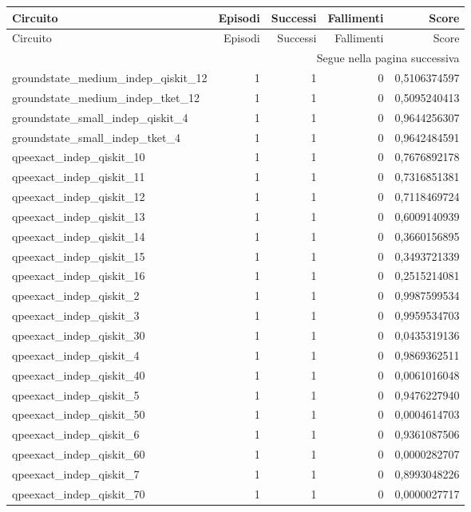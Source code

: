 \begin{longtable}{lrrrr}
\toprule
Circuito & Episodi & Successi & Fallimenti & Score \\
\midrule
\endfirsthead
\toprule
Circuito & Episodi & Successi & Fallimenti & Score \\
\midrule\endhead
\midrule\multicolumn{5}{r}{\footnotesize Segue nella pagina successiva}\\
\endfoot
\bottomrule\endlastfoot
groundstate\_medium\_indep\_qiskit\_12 & 1 & 1 & 0 & 0,5106374597 \\
groundstate\_medium\_indep\_tket\_12 & 1 & 1 & 0 & 0,5095240413 \\
groundstate\_small\_indep\_qiskit\_4 & 1 & 1 & 0 & 0,9644256307 \\
groundstate\_small\_indep\_tket\_4 & 1 & 1 & 0 & 0,9642484591 \\
qpeexact\_indep\_qiskit\_10 & 1 & 1 & 0 & 0,7676892178 \\
qpeexact\_indep\_qiskit\_11 & 1 & 1 & 0 & 0,7316851381 \\
qpeexact\_indep\_qiskit\_12 & 1 & 1 & 0 & 0,7118469724 \\
qpeexact\_indep\_qiskit\_13 & 1 & 1 & 0 & 0,6009140939 \\
qpeexact\_indep\_qiskit\_14 & 1 & 1 & 0 & 0,3660156895 \\
qpeexact\_indep\_qiskit\_15 & 1 & 1 & 0 & 0,3493721339 \\
qpeexact\_indep\_qiskit\_16 & 1 & 1 & 0 & 0,2515214081 \\
qpeexact\_indep\_qiskit\_2 & 1 & 1 & 0 & 0,9987599534 \\
qpeexact\_indep\_qiskit\_3 & 1 & 1 & 0 & 0,9959534703 \\
qpeexact\_indep\_qiskit\_30 & 1 & 1 & 0 & 0,0435319136 \\
qpeexact\_indep\_qiskit\_4 & 1 & 1 & 0 & 0,9869362511 \\
qpeexact\_indep\_qiskit\_40 & 1 & 1 & 0 & 0,0061016048 \\
qpeexact\_indep\_qiskit\_5 & 1 & 1 & 0 & 0,9476227940 \\
qpeexact\_indep\_qiskit\_50 & 1 & 1 & 0 & 0,0004614703 \\
qpeexact\_indep\_qiskit\_6 & 1 & 1 & 0 & 0,9361087506 \\
qpeexact\_indep\_qiskit\_60 & 1 & 1 & 0 & 0,0000282707 \\
qpeexact\_indep\_qiskit\_7 & 1 & 1 & 0 & 0,8993048226 \\
qpeexact\_indep\_qiskit\_70 & 1 & 1 & 0 & 0,0000027717 \\

\end{longtable}
